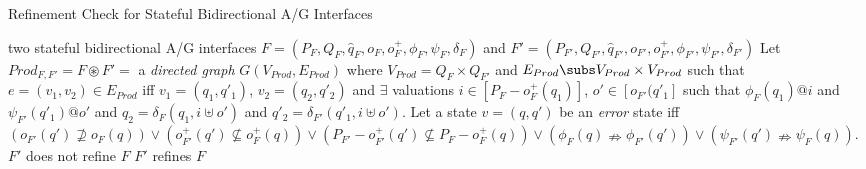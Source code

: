 \begin{algorithm}[ht]
\caption{Refinement Check for Stateful Bidirectional A/G Interfaces} \label{algo2}
\begin{algorithmic}[1]
\REQUIRE two stateful bidirectional A/G interfaces 
$F = (P_F,Q_F,\hat{q}_F,o_F,o^+_F,\phi_F,\psi_F,\delta_F)$ and
$F' = (P_{F'},Q_{F'},\hat{q}_{F'},o_{F'},o^+_{F'},\phi_{F'},\psi_{F'},\delta_{F'})$
\STATE Let $Prod_{F,F'} = F \circledast F' =$ a \emph{directed graph} 
$G(V_{Prod},E_{Prod})$ where 
$V_{Prod} = Q_F \times Q_{F'}$ and $E_{Prod} \subs V_{Prod} \times V_{Prod}$
such that $e = (v_1,v_2) \in E_{Prod}$ iff $v_1 = (q_1,q'_1)$, $v_2 = (q_2,q'_2)$
and $\exists$ valuations $i \in [P_F - o^+_F(q_1)]$, $o' \in [o_{F'}(q'_1]$ such that 
$\phi_F(q_1) @ i$ and $\psi_{F'}(q'_1) @ o'$ and $q_2 = \delta_F(q_1,i \uplus o')$
and $q'_2 = \delta_{F'}(q'_1,i \uplus o')$.
\STATE Let a state $v = (q,q')$ be an {\em error} state iff 
$(o_{F'}(q') \nsupseteq o_F(q)) \lor (o^+_{F'}(q') \nsubseteq o^+_F(q)) 
\lor (P_{F'} - o^+_{F'}(q') \nsubseteq P_F - o^+_F(q)) \lor 
(\phi_F(q) \nRightarrow \phi_{F'}(q')) \lor 
(\psi_{F'}(q') \nRightarrow \psi_F(q))$.
\STATE $F'$ does not refine $F$
\ELSE
\STATE $F'$ refines $F$
\ENDIF
\end{algorithmic}
\end{algorithm}

